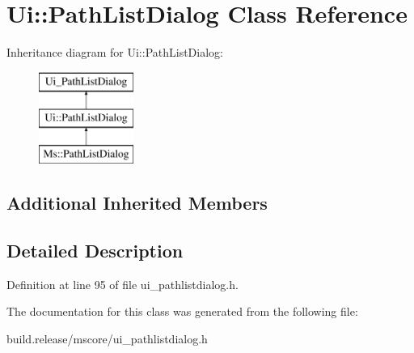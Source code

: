 \hypertarget{class_ui_1_1_path_list_dialog}{}\section{Ui\+:\+:Path\+List\+Dialog Class Reference}
\label{class_ui_1_1_path_list_dialog}
Inheritance diagram for Ui\+:\+:Path\+List\+Dialog\+:\begin{figure}[H]
\begin{center}
\leavevmode
\includegraphics[height=3.000000cm]{class_ui_1_1_path_list_dialog}
\end{center}
\end{figure}
\subsection*{Additional Inherited Members}


\subsection{Detailed Description}


Definition at line 95 of file ui\+\_\+pathlistdialog.\+h.



The documentation for this class was generated from the following file\+:\begin{DoxyCompactItemize}
\item 
build.\+release/mscore/ui\+\_\+pathlistdialog.\+h\end{DoxyCompactItemize}
